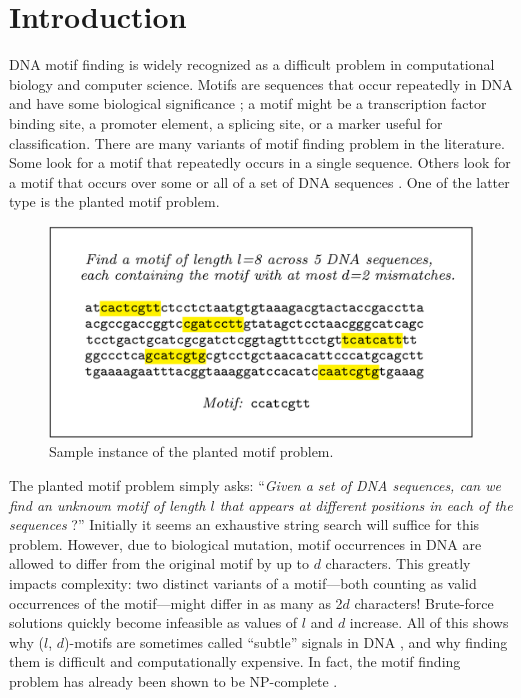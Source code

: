 \documentclass[oneside,12pt]{DISCSthesis}
\begin{document}
\chapter{Introduction}
		DNA motif finding is widely recognized as a difficult problem in computational biology and computer science. Motifs are sequences that occur repeatedly in DNA and have some biological significance \cite{das2007survey}; a motif might be a transcription factor binding site, a promoter element, a splicing site, or a marker useful for classification. There are many variants of motif finding problem in the literature. Some look for a motif that repeatedly occurs in a single sequence. Others look for a motif that occurs over some or all of a set of DNA sequences \cite{dasari2010efficient}. One of the latter type is the planted motif problem.\newline

		\begin{figure}[h] \label{fig:example}
			\centering
			\includegraphics[width=5.5in]{img/example}
			\caption{Sample instance of the planted motif problem.}
			\end{figure}

		The planted motif problem simply asks: ``\emph{Given a set of DNA sequences, can we find an unknown motif of length $l$ that appears at different positions in each of the sequences} \cite{pevzner2000combinatorial}?'' Initially it seems an exhaustive string search will suffice for this problem. However, due to biological mutation, motif occurrences in DNA are allowed to differ from the original motif by up to $d$ characters. This greatly impacts complexity: two distinct variants of a motif---both counting as valid occurrences of the motif---might differ in as many as 2$d$ characters! Brute-force solutions quickly become infeasible as values of $l$ and $d$ increase. All of this shows why ($l$, $d$)-motifs are sometimes called ``subtle'' signals in DNA  \cite{pevzner2000combinatorial}, and why finding them is difficult and computationally expensive. In fact, the motif finding problem has already been shown to be NP-complete \cite{pms2014}. 
\end{document}
